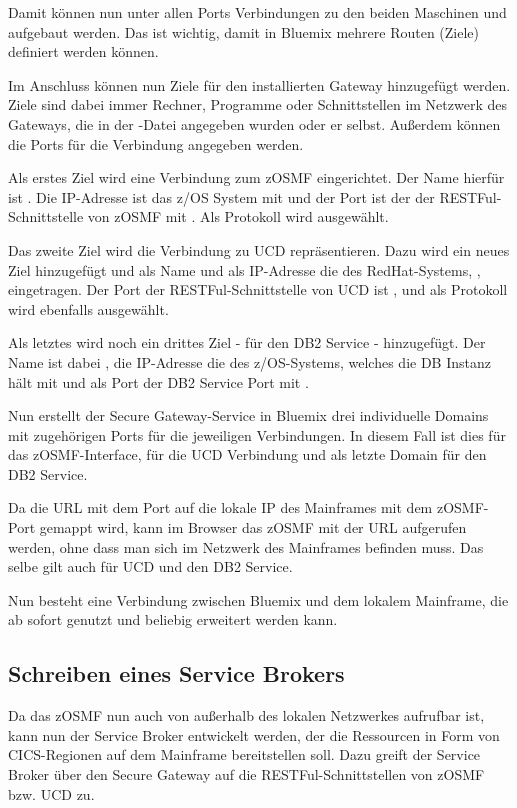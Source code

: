 Damit können nun unter allen Ports Verbindungen zu den beiden Maschinen  und  aufgebaut
werden. Das ist wichtig, damit in Bluemix mehrere Routen (Ziele) definiert werden können.

Im Anschluss können nun Ziele für den installierten Gateway hinzugefügt werden. Ziele sind dabei immer Rechner, Programme
oder Schnittstellen im Netzwerk des Gateways, die in der -Datei angegeben wurden oder er selbst. Außerdem
können die Ports für die Verbindung angegeben werden.

Als erstes Ziel wird eine Verbindung zum zOSMF eingerichtet. Der Name hierfür ist . Die IP-Adresse ist das
z/OS System mit  und der Port ist der der RESTFul-Schnittstelle von zOSMF mit . Als Protokoll
wird  ausgewählt.

Das zweite Ziel wird die Verbindung zu UCD repräsentieren. Dazu wird ein neues Ziel hinzugefügt und als Name 
und als IP-Adresse die des RedHat-Systems, , eingetragen. Der Port der RESTFul-Schnittstelle von UCD
ist , und als Protokoll wird ebenfalls  ausgewählt.

Als letztes wird noch ein drittes Ziel - für den DB2 Service - hinzugefügt. Der Name ist dabei , die
IP-Adresse die des z/OS-Systems, welches die DB Instanz hält mit  und als Port der DB2 Service Port mit
.

Nun erstellt der Secure Gateway-Service in Bluemix drei individuelle Domains mit zugehörigen  Ports für die jeweiligen
Verbindungen. In diesem Fall ist dies  für das zOSMF-Interface,
 für die UCD Verbindung und als letzte Domain
 für den DB2 Service.

Da die URL mit dem Port auf die lokale IP des Mainframes mit dem zOSMF-Port gemappt wird, kann im Browser das zOSMF mit
der URL aufgerufen werden, ohne dass man sich im Netzwerk des Mainframes befinden muss. Das selbe gilt auch für UCD und
den DB2 Service.

Nun besteht eine Verbindung zwischen Bluemix und dem lokalem Mainframe, die ab sofort genutzt und beliebig erweitert
werden kann.

\subsection{Schreiben eines Service Brokers}
\label{subsection:writeservicebroker}
Da das zOSMF nun auch von außerhalb des lokalen Netzwerkes aufrufbar ist, kann nun der Service Broker entwickelt werden,
der die Ressourcen in Form von CICS-Regionen auf dem Mainframe bereitstellen soll. Dazu greift der Service Broker über den
Secure Gateway auf die RESTFul-Schnittstellen von zOSMF bzw. UCD zu.

